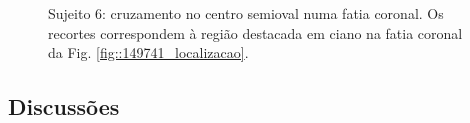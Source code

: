 \begin{figure}[H]
\centering
    \hfill
    \caption{Sujeito 6: cruzamento no centro semioval numa fatia coronal. Os recortes correspondem à região destacada em ciano na fatia coronal da Fig. \ref{fig::149741_localizacao}.
    }
    \label{fig::149741_crossing}
\end{figure}


\subsection{Discussões}
\label{ssec::visual_discussoes}


